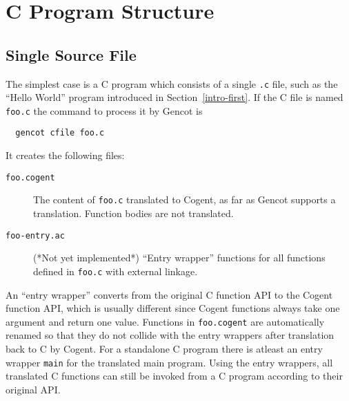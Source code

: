 \documentclass[a4paper]{report}
\newcommand{\code}[1]{\textnormal{\texttt{#1}}}
\begin{document}
\chapter{C Program Structure}
\label{struct}

\section{Single Source File}
\label{struct-single}

The simplest case is a C program which consists of a single \code{.c} file, such as the ``Hello World'' program
introduced in Section~\ref{intro-first}. If the C file is named \code{foo.c} the command to process it by Gencot is
\begin{verbatim}
  gencot cfile foo.c
\end{verbatim}
It creates the following files:
\begin{description}
\item[\code{foo.cogent}] The content of \code{foo.c} translated to Cogent, as far as Gencot supports a translation.
Function bodies are not translated.
\item[\code{foo-entry.ac}] (*Not yet implemented*) ``Entry wrapper'' functions for all functions defined in \code{foo.c} 
with external linkage.
\end{description}

An ``entry wrapper'' converts from the original C function API to the Cogent function API, which is usually different 
since Cogent functions always take one argument and return one value. Functions in \code{foo.cogent} are automatically
renamed so that they do not collide with the entry wrappers after translation back to C by Cogent. For a standalone
C program there is atleast an entry wrapper \code{main} for the translated main program. Using the entry wrappers, all
translated C functions can still be invoked from a C program according to their original API.
\end{document}
